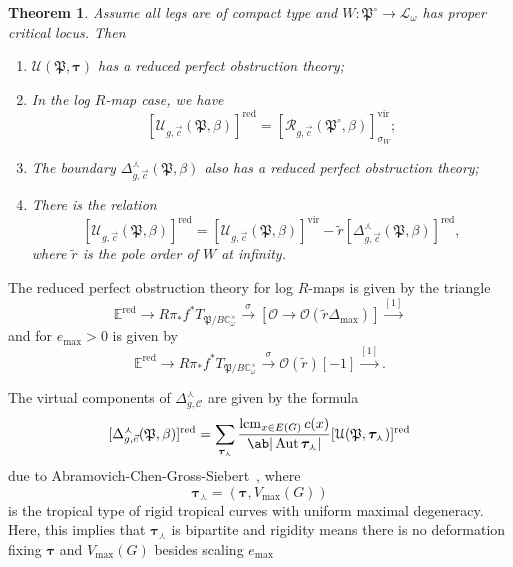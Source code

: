 \documentclass[10pt]{amsart}
\newtheorem{thm}{Theorem}[section]
\theoremstyle{definition}
\theoremstyle{remark}
\theoremstyle{plain}
\theoremstyle{definition}
\theoremstyle{remark}
\newcommand{\C}{\mathbb{C}}
\newcommand{\E}{\mathbb{E}}
\newcommand{\mc}[1]{\mathcal{#1}}
\newcommand{\mf}[1]{\mathfrak{#1}}
\newcommand{\btau}{\bm{\tau}}
\newcommand{\mr}[1]{\mathrm{#1}}
\newcommand{\on}[1]{\operatorname{#1}}
\newcommand{\1}{\mathbf{1}}
\newcommand{\2}{\mathbf{2}}
\newcommand{\3}{\mathbf{3}}
\newcommand{\vir}{\mr{vir}}
\DeclareMathOperator{\Aut}{Aut}
\begin{document}
\begin{thm}
    Assume all legs are of compact type and $W \colon \mf{P}^{\circ} \to \mc{L}_{\omega}$ has proper critical locus. Then
    \begin{enumerate}
        \item $\mc{U}(\mf{P},\btau)$ has a reduced perfect obstruction theory;
        \item In the log $R$-map case, we have
            \[ [\mc{U}_{g, \vec{c}}(\mf{P},\beta)]^{\on{red}} = [\mc{R}_{g,\vec{c}}(\mf{P}^{\circ}, \beta)]^{\vir}_{\sigma_W}; \]
        \item The boundary $\Delta_{g, \vec{c}}^{\curlywedge}(\mf{P}, \beta)$ also has a reduced perfect obstruction theory;
        \item There is the relation
            \[ [\mc{U}_{g, \vec{c}}(\mf{P}, \beta)]^{\on{red}} = [\mc{U}_{g, \vec{c}}(\mf{P}, \beta)]^{\vir} - \tilde{r} [\Delta^{\curlywedge}_{g, \vec{c}}(\mf{P}, \beta)]^{\on{red}}, \]
            where $\tilde{r}$ is the pole order of $W$ at infinity.
    \end{enumerate}
\end{thm}

The reduced perfect obstruction theory for log $R$-maps is given by the triangle
\[ \E^{\on{red}} \to R \pi_* f^* T_{\mf{P}/B\C_{\omega}^{\times}} \xrightarrow{\sigma} [\mc{O} \to \mc{O}(\tilde{r}\Delta_{\max})] \xrightarrow{[1]} \]
and for $e_{\max} > 0$ is given by
\[ \E^{\on{red}} \to R \pi_* f^* T_{\mf{P}/B\C_{\omega}^{\times}} \xrightarrow{\sigma} \mc{O}(\tilde{r})[-1] \xrightarrow{[1]}. \]

The virtual components of $\Delta_{g,\mc{C}}^{\curlywedge}$ are given by the formula
\[ [\Delta_{g, \vec{c}}^{\curlywedge}(\mf{P}, \beta)]^{\on{red}} = \sum_{\btau_{\curlywedge}} \frac{\on{lcm}_{x\in E(G)} c(x)}{\ab|\Aut \btau_{\curlywedge}|} [\mc{U}(\mf{P}, \btau_{\curlywedge})]^{\on{red}} \]
due to Abramovich-Chen-Gross-Siebert~\cite{puncturedlog}, where
\[ \btau_{\curlywedge} = (\btau, V_{\max}(G)) \]
is the tropical type of rigid tropical curves with uniform maximal degeneracy. Here, this implies that $\btau_{\curlywedge}$ is bipartite and rigidity means there is no deformation fixing $\btau$ and $V_{\max}(G)$ besides scaling $e_{\max}$
\end{document}
